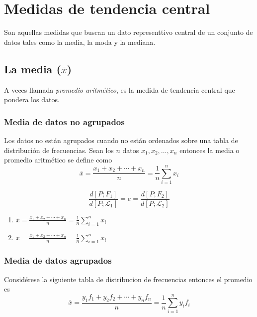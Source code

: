 \documentclass[10pt,]{krantz}
\providecommand{\tightlist}{%
  \setlength{\itemsep}{0pt}\setlength{\parskip}{0pt}}
\theoremstyle{definition}
\theoremstyle{definition}
\theoremstyle{definition}
\theoremstyle{definition}
\theoremstyle{remark}
\begin{document}
\hypertarget{medidas-de-tendencia-central}{%
\chapter{Medidas de tendencia central}\label{medidas-de-tendencia-central}}

Son aquellas medidas que buscan un dato representtivo central de un conjunto de datos tales como la media, la moda y la mediana.

\hypertarget{la-media-overlinex}{%
\section{\texorpdfstring{La media (\(\overline{x}\))}{La media (\textbackslash{}overline\{x\})}}\label{la-media-overlinex}}

A veces llamada \emph{promedio aritmético}, es la medida de tendencia central que pondera los datos.

\hypertarget{media-de-datos-no-agrupados}{%
\subsection{Media de datos no agrupados}\label{media-de-datos-no-agrupados}}

Los datos no están agrupados cuando no están ordenados sobre una tabla de distribución de frecuencias. Sean los \(n\) datos \(x_1, x_2, \ldots, x_n\) entonces la media o promedio aritmético se define como
\[ \label{eq:w1} 
\overline{x}=\frac{x_1+x_2+\cdots+x_n}{n}=\frac{1}{n}\sum_{i=1}^nx_i 
\]

\[ 
\label{eq:ww}
\frac{d\left[P; F_1\right]}{d\left[P; \mathcal{L}_1\right]}=e=\frac{d\left[P; F_2\right]}{d\left[P; \mathcal{L}_2\right]}
\]

\begin{enumerate}
\def\labelenumi{\arabic{enumi}.}
\tightlist
\item
  \(\overline{x}=\frac{x_1+x_2+\cdots+x_n}{n}=\frac{1}{n}\sum_{i=1}^nx_i\)
\item
  \(\overline{x}=\frac{x_1+x_2+\cdots+x_n}{n}=\frac{1}{n}\sum_{i=1}^nx_i\)
\end{enumerate}

\hypertarget{media-de-datos-agrupados}{%
\subsection{Media de datos agrupados}\label{media-de-datos-agrupados}}

Considérese la siguiente tabla de distribucion de frecuencias entonces el promedio es \[\overline{x}=\frac{y_1f_1+y_2f_2+\cdots+y_nf_n}{n}=\frac{1}{n}\sum_{i=1}^ny_if_i\]
\end{document}
